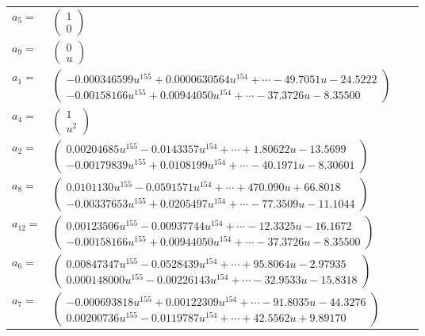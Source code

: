 \documentclass[1p]{elsarticle_modified}
\theoremstyle{definition}
\begin{document}
\begin{tabular}{m{7pt} m{180pt} m{7pt} m{180pt} }
\flushright $a_{5}=$&$\begin{pmatrix}1\\0\end{pmatrix}$ \\
\flushright $a_{9}=$&$\begin{pmatrix}0\\u\end{pmatrix}$ \\
\flushright $a_{1}=$&$\begin{pmatrix}-0.000346599 u^{155}+0.0000630564 u^{154}+\cdots-49.7051 u-24.5222\\-0.00158166 u^{155}+0.00944050 u^{154}+\cdots-37.3726 u-8.35500\end{pmatrix}$ \\
\flushright $a_{4}=$&$\begin{pmatrix}1\\u^2\end{pmatrix}$ \\
\flushright $a_{2}=$&$\begin{pmatrix}0.00204685 u^{155}-0.0143357 u^{154}+\cdots+1.80622 u-13.5699\\-0.00179839 u^{155}+0.0108199 u^{154}+\cdots-40.1971 u-8.30601\end{pmatrix}$ \\
\flushright $a_{8}=$&$\begin{pmatrix}0.0101130 u^{155}-0.0591571 u^{154}+\cdots+470.090 u+66.8018\\-0.00337653 u^{155}+0.0205497 u^{154}+\cdots-77.3509 u-11.1044\end{pmatrix}$ \\
\flushright $a_{12}=$&$\begin{pmatrix}0.00123506 u^{155}-0.00937744 u^{154}+\cdots-12.3325 u-16.1672\\-0.00158166 u^{155}+0.00944050 u^{154}+\cdots-37.3726 u-8.35500\end{pmatrix}$ \\
\flushright $a_{6}=$&$\begin{pmatrix}0.00847347 u^{155}-0.0528439 u^{154}+\cdots+95.8064 u-2.97935\\0.000148000 u^{155}-0.00226143 u^{154}+\cdots-32.9533 u-15.8318\end{pmatrix}$ \\
\flushright $a_{7}=$&$\begin{pmatrix}-0.000693818 u^{155}+0.00122309 u^{154}+\cdots-91.8035 u-44.3276\\0.00200736 u^{155}-0.0119787 u^{154}+\cdots+42.5562 u+9.89170\end{pmatrix}$ \\

\end{tabular}
\end{document}
